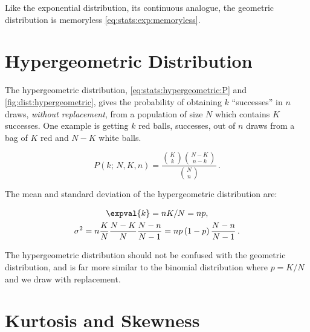 Like the exponential distribution, its continuous analogue, the geometric distribution is memoryless \cref{eq:stats:exp:memoryless}.

\section{Hypergeometric Distribution}
\label{stats:hypergeo_dist}

The hypergeometric distribution, \cref{eq:stats:hypergeometric:P} and \cref{fig:dist:hypergeometric},
gives the probability of obtaining $k$ ``successes'' in $n$ draws, {\em without replacement},
from a population of size $N$ which contains $K$ successes.
One example is getting $k$ red balls, \ie successes,
out of $n$ draws from a bag of $K$ red and $N-K$ white balls.

\begin{equation}\label{eq:stats:hypergeometric:P}
P\left(k;\,N,K,n\right) = \frac{\binom{K}{k}\binom{N-K}{n-k}}{\binom{N}{n}}\,.
\end{equation}

The mean and standard deviation of the hypergeometric distribution are:

\begin{subequations}\label{eq:stats:hypergeometric:neg:mean_variance}
\begin{gather}
\expval{k} = n K / N = n p, \label{eq:stats:hypergeometric:mean} \\
\sigma^{2} = n \frac{K}{N} \frac{N-K}{N} \frac{N-n}{N-1} = n p \left(1-p\right) \frac{N-n}{N-1}\,. \label{eq:stats:hypergeometric:variance}
\end{gather}
\end{subequations}

The hypergeometric distribution should not be confused with the geometric distribution,
and is far more similar to the binomial distribution where $p = K/N$ and we draw with replacement.

\section{Kurtosis and Skewness}
\label{stats:kurtosis_skewness}

